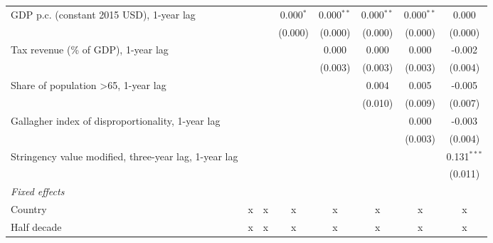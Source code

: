 \begin{table}[htbp]
\begin{tabular}{lccccccc}
      GDP p.c. (constant 2015 USD), 1-year lag                                 &               &               & 0.000$^{*}$   & 0.000$^{**}$  & 0.000$^{**}$  & 0.000$^{**}$  & 0.000\\   
                                                                               &               &               & (0.000)       & (0.000)       & (0.000)       & (0.000)       & (0.000)\\   
      Tax revenue (\% of GDP), 1-year lag                                      &               &               &               & 0.000         & 0.000         & 0.000         & -0.002\\   
                                                                               &               &               &               & (0.003)       & (0.003)       & (0.003)       & (0.004)\\   
      Share of population >65, 1-year lag                                      &               &               &               &               & 0.004         & 0.005         & -0.005\\   
                                                                               &               &               &               &               & (0.010)       & (0.009)       & (0.007)\\   
      Gallagher index of disproportionality, 1-year lag                        &               &               &               &               &               & 0.000         & -0.003\\   
                                                                               &               &               &               &               &               & (0.003)       & (0.004)\\   
      Stringency value modified, three-year lag, 1-year lag                    &               &               &               &               &               &               & 0.131$^{***}$\\   
                                                                               &               &               &               &               &               &               & (0.011)\\   
      \emph{Fixed effects}\\
      Country                                                                  & x             & x             & x             & x             & x             & x             & x\\  
      Half decade                                                              & x             & x             & x             & x             & x             & x             & x\\  

\end{tabular}
\end{table}
